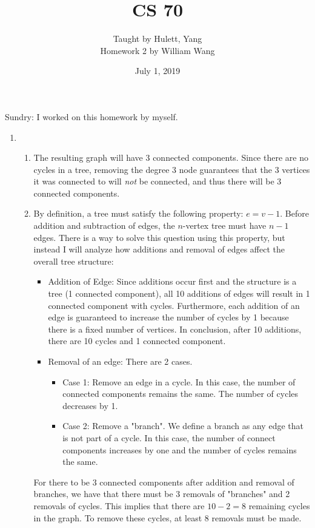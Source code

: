 \documentclass[a4paper]{article}
\title{\textbf{CS 70}}
\author{\large Taught by Hulett, Yang\\
Homework 2 by William Wang}
\date{July 1, 2019}
\newcommand{\<}{\langle}
\renewcommand{\>}{\rangle}
\renewcommand{\^}{\wedge}
\begin{document}
\maketitle
\newpage
Sundry: I worked on this homework by myself.\\
\begin{enumerate}
    \item
        \begin{enumerate}
            \item The resulting graph will have 3 connected components. Since there are no cycles in a tree, removing the degree 3 node guarantees that the 3 vertices it was connected to will \textit{not} be connected, and thus there will be 3 connected components.
            
            \item By definition, a tree must satisfy the following property: $e = v-1$. Before addition and subtraction of edges, the $n$-vertex tree must have $n-1$ edges. There is a way to solve this question using this property, but instead I will analyze how additions and removal of edges affect the overall tree structure:
                \begin{itemize}
                    \item Addition of Edge: Since additions occur first and the structure is a tree (1 connected component), all 10 additions of edges will result in 1 connected component with cycles. Furthermore, each addition of an edge is guaranteed to increase the number of cycles by 1 because there is a fixed number of vertices. In conclusion, after 10 additions, there are 10 cycles and 1 connected component.
                    \item Removal of an edge: There are 2 cases.
                        \begin{itemize}
                            \item Case 1: Remove an edge in a cycle. In this case, the number of connected components remains the same. The number of cycles decreases by 1.
                            \item Case 2: Remove a "branch". We define a branch as any edge that is not part of a cycle. In this case, the number of connect components increases by one and the number of cycles remains the same.
                        \end{itemize}
                \end{itemize}
            For there to be 3 connected components after addition and removal of branches, we have that there must be 3 removals of "branches" and 2 removals of cycles. This implies that there are $10 - 2 = 8$ remaining cycles in the graph. To remove these cycles, at least 8 removals must be made.
            

\end{enumerate}
\end{enumerate}
\end{document}
